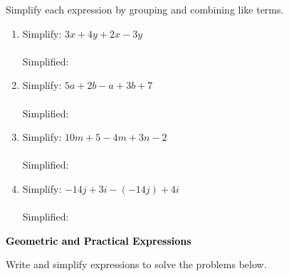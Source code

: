 \documentclass[12pt, letterpaper, fleqn]{article}
\newcommand{\blanklong}{\underline{\hspace{6.5cm}}}
\begin{document}
\noindent
Simplify each expression by grouping and combining like terms.

\vspace{3mm}

\begin{enumerate}[itemsep=1.5cm, leftmargin=0.6cm]

\item Simplify: $3x + 4y + 2x - 3y$ \\ \\
Simplified: \blanklong

\vspace{1.5cm}

\item Simplify: $5a + 2b - a + 3b + 7$ \\ \\
Simplified: \blanklong

\vspace{1.5cm}

\item Simplify: $10m + 5 - 4m + 3n - 2$ \\ \\
Simplified: \blanklong

\vspace{1.5cm}

\item Simplify: $-14j + 3i -(-14j) + 4i$ \\ \\
Simplified: \blanklong

\vspace{1.5cm}

\end{enumerate}

\newpage

\begin{tcolorbox}[colback=black!10]
\large\textcolor{black}{\textbf{Geometric and Practical Expressions}}
\end{tcolorbox}

\noindent
Write and simplify expressions to solve the problems below.

\vspace{3mm}
\end{document}
